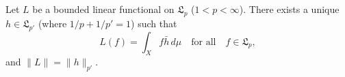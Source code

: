Let $L$ be a bounded linear functional on $\mathfrak{L}_p$ ($1 < p < \infty$). There exists a unique $h \in \mathfrak{L}_{p'}$ (where $1/p + 1/p' = 1$) such that
$$L(f) = \int_X f \bar{h} \, d\mu \quad \text{for all} \quad f \in \mathfrak{L}_p,$$
and $\|L\| = \|h\|_{p'}$.
